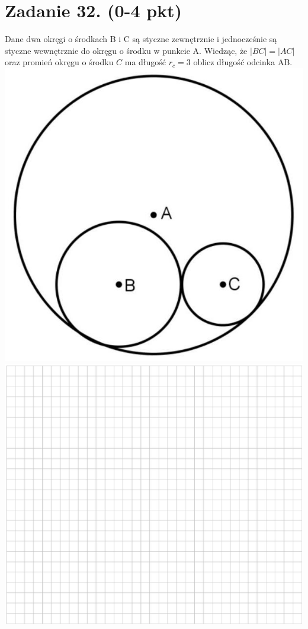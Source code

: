 \documentclass[10pt]{article}
\begin{document}
\section*{Zadanie 32. (0-4 pkt)}
Dane dwa okręgi o środkach B i C są styczne zewnętrznie i jednocześnie są styczne wewnętrznie do okręgu o środku w punkcie A. Wiedząc, że \(|B C|=|A C|\) oraz promień okręgu o środku \(C\) ma długość \(r_{c}=3\) oblicz długość odcinka AB.\\
\includegraphics[max width=\textwidth, center]{2024_11_21_b8ac5f500a5bbb1b4ec5g-15}\\
\includegraphics[max width=\textwidth, center]{2024_11_21_b8ac5f500a5bbb1b4ec5g-15(1)}
\end{document}

